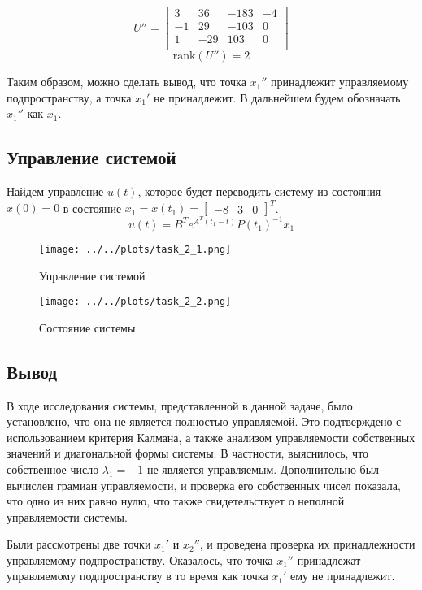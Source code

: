 \begin{equation}
   U'' = \begin{bmatrix}
        3 & 36 & -183 & -4 \\ 
        -1 & 29 & -103 & 0 \\ 
        1 & -29 & 103 & 0 \\
    \end{bmatrix}
\end{equation}
\begin{equation}
    \text{rank}(U'') = 2
\end{equation}

Таким образом, можно сделать вывод, что точка $x_1''$ принадлежит управляемому подпространству, а точка $x_1'$ не принадлежит. В дальнейшем будем обозначать $x_1''$ как $x_1$.

\subsection{Управление системой}
Найдем управление $u(t)$, которое будет переводить систему из состояния $x(0) = 0$ в состояние $x_1 = x(t_1) = \begin{bmatrix} -8 & 3 & 0 \end{bmatrix}^T$. 
\begin{equation}
    u(t) = B^Te^{A^T(t_1 - t)}P(t_1)^{-1}x_1
\end{equation}

\begin{figure}[H]
    \centering
    \texttt{[image: ../../plots/task\_2\_1.png]}
    \caption{Управление системой}
    \label{fig:task2_control_signal}
\end{figure}

\begin{figure}[H]
    \centering
    \texttt{[image: ../../plots/task\_2\_2.png]}
    \caption{Состояние системы}
    \label{fig:task2_state}
\end{figure}

\subsection{Вывод}
В ходе исследования системы, представленной в данной задаче, было установлено, 
что она не является полностью управляемой. 
Это подтверждено с использованием критерия Калмана, 
а также анализом управляемости собственных значений и диагональной формы системы. 
В частности, выяснилось, что собственное число $\lambda_1 = -1$ не является 
управляемым. Дополнительно был вычислен грамиан управляемости, 
и проверка его собственных чисел показала, что одно из них равно нулю, 
что также свидетельствует о неполной управляемости системы.

Были рассмотрены две точки $x_1'$ и $x_2''$, и проведена проверка их принадлежности 
управляемому подпространству. Оказалось, что точка $x_1''$ принадлежат управляемому подпространству
в то время как точка $x_1'$ ему не принадлежит. 